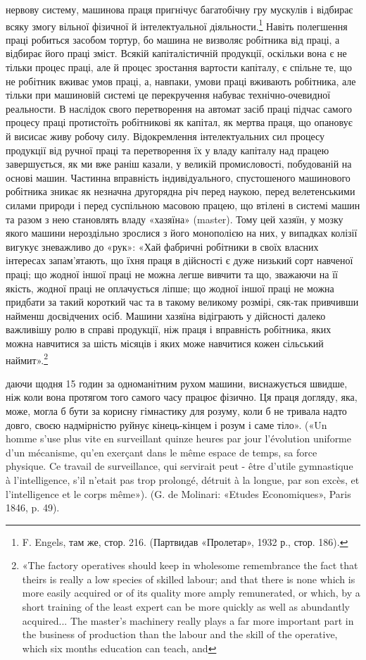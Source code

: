 нервову систему, машинова праця пригнічує багатобічну гру
мускулів і відбирає всяку змогу вільної фізичної й інтелектуальної
діяльности.\footnote{
F. Engels, там же, стор. 216. (Партвидав «Пролетар», 1932 р.,
стор. 186).
} Навіть полегшення праці робиться засобом тортур,
бо машина не визволяє робітника від праці, а відбирає його
праці зміст. Всякій капіталістичній продукції, оскільки вона є
не тільки процес праці, але й процес зростання вартости капіталу,
є спільне те, що не робітник вживає умов праці, а, навпаки,
умови праці вживають робітника, але тільки при машиновій
системі це перекручення набуває технічно-очевидної реальности.
В наслідок свого перетворення на автомат засіб праці підчас
самого процесу праці протистоїть робітникові як капітал,
як мертва праця, що опановує й висисає живу робочу силу. Відокремлення
інтелектуальних сил процесу продукції від ручної
праці та перетворення їх у владу капіталу над працею завершується,
як ми вже раніш казали, у великій промисловості, побудованій
на основі машин. Частинна вправність індивідуального,
спустошеного машинового робітника зникає як незначна другорядна
річ перед наукою, перед велетенськими силами природи
і перед суспільною масовою працею, що втілені в системі машин
та разом з нею становлять владу «хазяїна» (master). Тому цей хазяїн,
у мозку якого машини нероздільно зрослися з його монополією
на них, у випадках колізії вигукує зневажливо до «рук»:
«Хай фабричні робітники в своїх власних інтересах запам’ятають,
що їхня праця в дійсності є дуже низький сорт навченої
праці; що жодної іншої праці не можна легше вивчити та що,
зважаючи на її якість, жодної праці не оплачується ліпше; що
жодної іншої праці не можна придбати за такий короткий час та
в такому великому розмірі, сяк-так привчивши найменш досвідчених
осіб. Машини хазяїна відіграють у дійсності далеко важливішу
ролю в справі продукції, ніж праця і вправність робітника,
яких можна навчитися за шість місяців і яких може навчитися
кожен сільський наймит».\footnote{
«The factory operatives should keep in wholesome remembrance
the fact that theirs is really a low species of skilled labour; and that there
is none which is more easily acquired or of its quality more amply remunerated,
or which, by a short training of the least expert can be more quickly
as well as abundantly acquired... The master’s machinery really plays
a far more important part in the business of production than the labour
and the skill of the operative, which six months education can teach, and
}

даючи щодня 15 годин за одноманітним рухом машини, виснажується
швидше, ніж коли вона протягом того самого часу працює фізично. Ця праця
догляду, яка, може, могла б бути за корисну гімнастику для розуму,
коли б не тривала надто довго, своєю надмірністю руйнує кінець-кінцем
і розум і саме тіло». («Un homme s’use plus vite en surveillant quinze
heures par jour l’évolution uniforme d’un mécanisme, qu’en exerçant dans
le même espace de temps, sa force physique. Ce travail de surveillance,
qui servirait peut - être d’utile gymnastique à l’intelligence, s’il n’etait pas
trop prolongé, détruit à la longue, par son excès, et l’intelligence et le corps
même»). (G. de Molinari: «Etudes Economiques», Paris 1846, p. 49).
